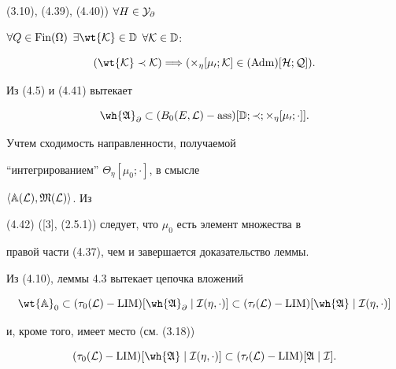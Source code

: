 \begin{pf}
(3.10), (4.39), (4.40)) $\forall H\in\cal Y_\partial$


$\forall Q\in \Fin(\Omega)$ $\exists\wt{\cal K}\in


\Bbb D$ $\forall\cal K\in\Bbb D$:


\begin{equation}


(\wt{\cal K}\prec\cal K)\Longrightarrow


(\Theta_\eta[\mu_0;\cal K]\in (\Adm)[H;Q]).


\end{equation}


Из (4.5) и (4.41) вытекает


\begin{equation}


\wh{\frak A}_\partial\subset(B_0(E,\cal L)-


\ass)[\Bbb D;\prec;\Theta_\eta[\mu_0;\cdot]].


\end{equation}





Учтем сходимость направленности, получаемой


``интегрированием'' $\Theta_\eta[\mu_0;\cdot]$, в смысле\linebreak


$\langle\Bbb A(\cal L),\frak M(\cal L)\rangle$. Из


(4.42) ([3], (2.5.1)) следует, что $\mu_0$ есть элемент множества в


правой части (4.37), чем и завершается доказательство леммы.


\end{pf}





Из (4.10), леммы 4.3 вытекает цепочка вложений


\begin{equation}


\wt{\Bbb A}_0\subset(\tau_0(\cal L)-


\LIM)[\wh{\frak A}_\partial\mid\cal I(\eta,\cdot)]\subset


(\tau_0(\cal L)-\LIM)[\wh{\frak A}\mid\cal I(\eta,\cdot)]


\end{equation}


и, кроме того, имеет место (см. (3.18))


\begin{equation}


(\tau_0(\cal L)-\LIM)[\wh{\frak A}\mid\cal I(\eta,


\cdot)]\subset(\tau_0(\cal L)-\LIM)[\frak A\mid\cal I].


\end{equation}



